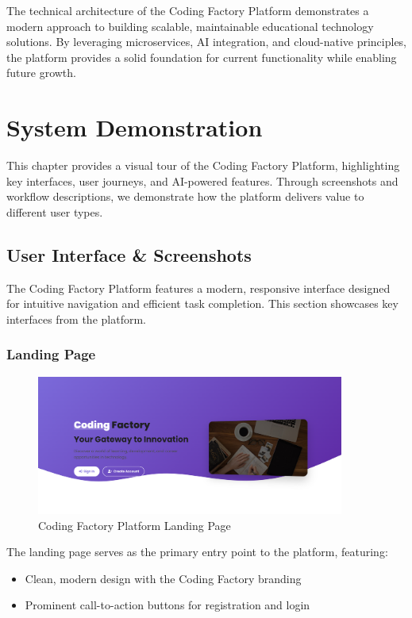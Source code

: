 \documentclass[12pt,a4paper]{report}
\begin{document}
The technical architecture of the Coding Factory Platform demonstrates a modern approach to building scalable, maintainable educational technology solutions. By leveraging microservices, AI integration, and cloud-native principles, the platform provides a solid foundation for current functionality while enabling future growth.

\chapter{System Demonstration}

This chapter provides a visual tour of the Coding Factory Platform, highlighting key interfaces, user journeys, and AI-powered features. Through screenshots and workflow descriptions, we demonstrate how the platform delivers value to different user types.

\section{User Interface \& Screenshots}

The Coding Factory Platform features a modern, responsive interface designed for intuitive navigation and efficient task completion. This section showcases key interfaces from the platform.

\subsection{Landing Page}

\begin{figure}[!htbp]
\centering
\includegraphics[width=0.9\textwidth]{media/Landing Page.png}
\caption{Coding Factory Platform Landing Page}
\label{fig:landing-page}
\end{figure}

The landing page serves as the primary entry point to the platform, featuring:

\begin{itemize}
    \item Clean, modern design with the Coding Factory branding
    \item Prominent call-to-action buttons for registration and login

\end{itemize}
\end{document}
